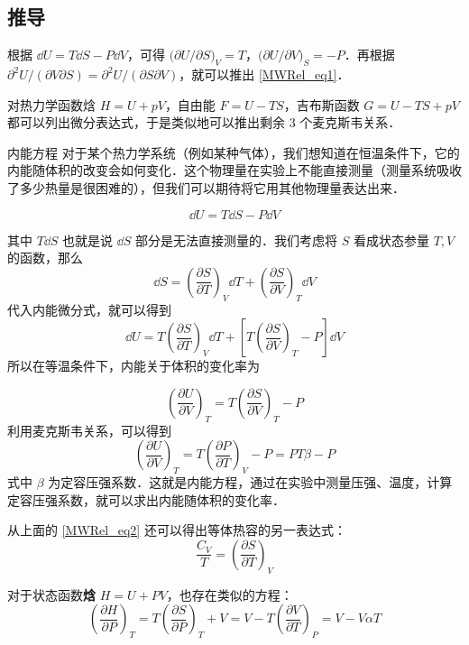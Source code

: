 \subsection{推导}
根据 $\dd U=T\dd S-P\dd V$，可得 $\Big(\partial U/\partial S\Big)_V=T$，$\Big(\partial U/\partial V\Big)_S=-P$．再根据 $\partial^2 U/(\partial V\partial S)=\partial^2 U/(\partial S\partial V)$，就可以推出 \autoref{MWRel_eq1}．

对热力学函数焓 $H=U+pV$，自由能 $F=U-TS$，吉布斯函数 $G=U-TS+pV$ 都可以列出微分表达式，于是类似地可以推出剩余 $3$ 个麦克斯韦关系．

\begin{example}{内能方程}
对于某个热力学系统（例如某种气体），我们想知道在恒温条件下，它的内能随体积的改变会如何变化．这个物理量在实验上不能直接测量（测量系统吸收了多少热量是很困难的），但我们可以期待将它用其他物理量表达出来．

\begin{equation}
\dd U=T\dd S-P\dd V
\end{equation}

其中 $T\dd S$ 也就是说 $\dd S$ 部分是无法直接测量的．我们考虑将 $S$ 看成状态参量 $T,V$ 的函数，那么 
\begin{equation}
\dd S=\left(\frac{\partial S}{\partial T}\right)_V \dd T+\left(\frac{\partial S}{\partial V}\right)_T \dd V
\end{equation}
代入内能微分式，就可以得到
\begin{equation}\label{MWRel_eq2}
\dd U=T\left(\frac{\partial S}{\partial T}\right)_V\dd T+\left[T\left(\frac{\partial S}{\partial V}\right)_T-P\right]\dd V
\end{equation}
所以在等温条件下，内能关于体积的变化率为

\begin{equation}
\left(\frac{\partial U}{\partial V}\right)_T=T\left(\frac{\partial S}{\partial V}\right)_T-P
\end{equation}
利用麦克斯韦关系，可以得到
\begin{equation}
\left(\frac{\partial U}{\partial V}\right)_T=T\left(\frac{\partial P}{\partial T}\right)_V-P=PT\beta-P
\end{equation}
式中 $\beta$ 为定容压强系数．这就是内能方程，通过在实验中测量压强、温度，计算定容压强系数，就可以求出内能随体积的变化率．

从上面的 \autoref{MWRel_eq2} 还可以得出等体热容的另一表达式：
\begin{equation}
\frac{C_V}{T}=\left(\frac{\partial S}{\partial T}\right)_V
\end{equation}

对于状态函数\textbf{焓} $H=U+PV$，也存在类似的方程：
\begin{equation}\label{MWRel_eq3}
\left(\frac{\partial H}{\partial P}\right)_T=T\left(\frac{\partial S}{\partial P}\right)_T+V
=V-T\left(\frac{\partial V}{\partial T}\right)_P=V-V\alpha T
\end{equation}

\end{example}
